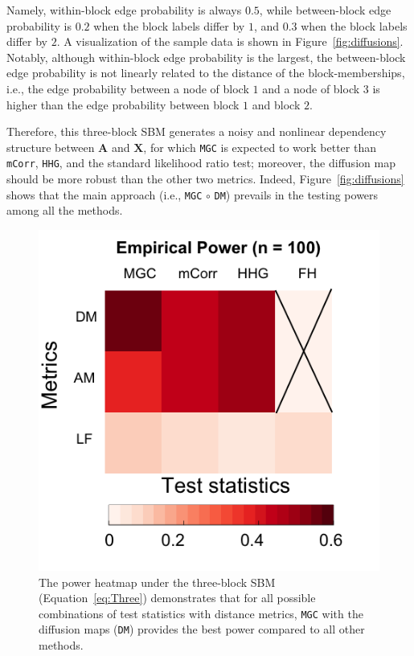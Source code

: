 \documentclass[11pt]{article}
\theoremstyle{definition}
\begin{document}
Namely, within-block edge probability is always $0.5$, while between-block edge probability is $0.2$ when the block labels differ by $1$, and $0.3$ when the block labels differ by $2$. A visualization of the sample data is shown in Figure~\ref{fig:diffusions}. 
Notably, although within-block edge probability is the largest, the between-block edge probability is not linearly related to the distance of the block-memberships, i.e., the edge probability between a node of block $1$ and a node of block $3$ is higher than the edge probability between block $1$ and block $2$. 

Therefore, this three-block SBM generates a noisy and nonlinear dependency structure between $\mathbf{A}$ and $\mathbf{X}$, for which \texttt{MGC} is expected to work better than \texttt{mCorr}, \texttt{HHG}, and the standard likelihood ratio test; moreover, the diffusion map should be more robust than the other two metrics. Indeed, Figure~\ref{fig:diffusions} shows that the main approach (i.e., \texttt{MGC} $\circ$ \texttt{DM}) prevails in the testing powers among all the methods.

\begin{figure}
	\centering
	\includegraphics[width=0.4\paperwidth, height=0.4\paperwidth]{../Figure/ThreeSBM_Elbow3.png}
	\caption{The power heatmap under the three-block SBM (Equation~\ref{eq:Three}) demonstrates that for all possible combinations of test statistics with distance metrics, \texttt{MGC} with the diffusion maps (\texttt{DM}) provides the best power compared to all other methods.}
	\label{fig:threeSBM}
\end{figure}
\end{document}
